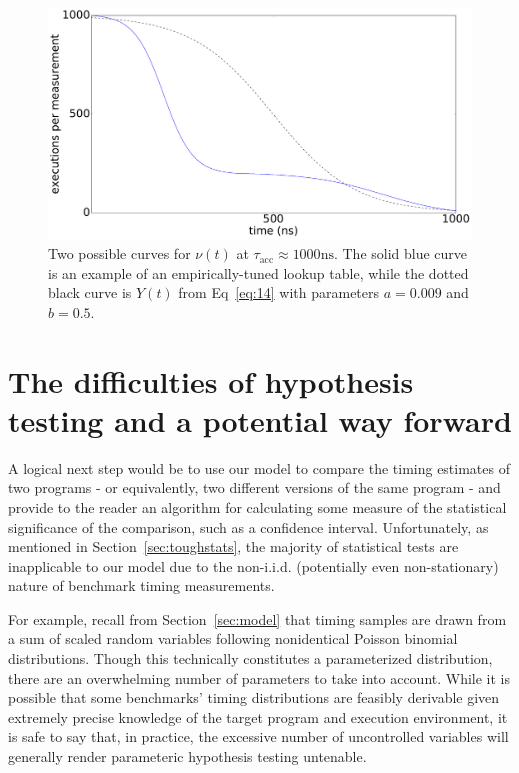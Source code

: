 \documentclass[conference]{IEEEtran}
\begin{document}
\begin{figure}
\centering
\includegraphics[width=\columnwidth]{figures/fig5/oracle}
\caption{Two possible curves for $\nu(t)$ at $\tau_{\textrm{acc}} \approx 1000 \textrm{ns}$.
The solid blue curve is an example of an empirically-tuned lookup table, while the dotted
black curve is $Y(t)$ from Eq~\ref{eq:14} with parameters $a = 0.009$ and $b = 0.5$.}
\label{fig:oracle}
\end{figure}

\label{sec:hypotesting}
\section{The difficulties of hypothesis testing and a potential way forward}

A logical next step would be to use our model to compare the timing estimates of two
programs - or equivalently, two different versions of the same program - and provide to the
reader an algorithm for calculating some measure of the statistical significance of the
comparison, such as a confidence interval. Unfortunately, as mentioned in
Section~\ref{sec:toughstats}, the majority of statistical tests are inapplicable to our
model due to the non-i.i.d. (potentially even non-stationary) nature of benchmark timing
measurements.

For example, recall from Section~\ref{sec:model} that timing samples are drawn from a sum of
scaled random variables following nonidentical Poisson binomial distributions. Though this
technically constitutes a parameterized distribution, there are an overwhelming number of
parameters to take into account. While it is possible that some benchmarks' timing
distributions are feasibly derivable given extremely precise knowledge of the target program
and execution environment, it is safe to say that, in practice, the excessive number of
uncontrolled variables will generally render parameteric hypothesis testing untenable.
\end{document}
